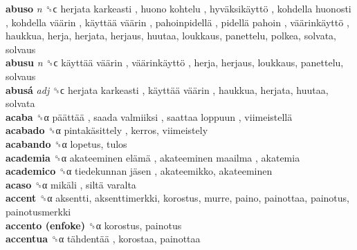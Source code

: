 \textbf{abuso} \emph{n}  ␝ϲ   herjata karkeasti ,  huono kohtelu ,  hyväksikäyttö ,  kohdella huonosti ,  kohdella väärin ,  käyttää väärin ,  pahoinpidellä ,  pidellä pahoin ,  väärinkäyttö , haukkua, herja, herjata, herjaus, huutaa, loukkaus, panettelu, polkea, solvata, solvaus  \\
\textbf{abusu} \emph{n}  ␝ϲ   käyttää väärin ,  väärinkäyttö , herja, herjaus, loukkaus, panettelu, solvaus  \\
\textbf{abusá} \emph{adj}  ␝ϲ   herjata karkeasti ,  käyttää väärin , haukkua, herjata, huutaa, solvata  \\
\textbf{acaba} ␝α   päättää ,  saada valmiiksi ,  saattaa loppuun ,  viimeistellä   \\
\textbf{acabado} ␝α   pintakäsittely , kerros, viimeistely  \\
\textbf{acabando} ␝α  lopetus, tulos  \\
\textbf{academia} ␝α   akateeminen elämä ,  akateeminen maailma , akatemia  \\
\textbf{academico} ␝α   tiedekunnan jäsen , akateemikko, akateeminen  \\
\textbf{acaso} ␝α   mikäli ,  siltä varalta   \\
\textbf{accent} ␝α  aksentti, aksenttimerkki, korostus, murre, paino, painottaa, painotus, painotusmerkki  \\
\textbf{accento (enfoke)} ␝α  korostus, painotus  \\
\textbf{accentua} ␝α   tähdentää , korostaa, painottaa  \\
